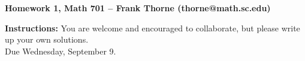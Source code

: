 \documentclass[12pt]{article}
\begin{document}
\setlength{\topmargin}{-2mm}



\newcommand{\sump}{\sideset{}{'}\sum}
\newcommand{\Aa}{{\alpha}}
\newcommand{\cD}{\mathcal{D}}
\newcommand{\C}{\mathbb{C}}
\newcommand{\N}{{\rm{N}}}
\newcommand{\re}{{\rm{max\,red}}}
\newcommand{\nonmax}{{\rm{nonmax}}}
\newcommand{\ma}{{\rm{max}}}
\newcommand{\PGL}{{\rm{PGL}}}
\newcommand{\diag}{{\rm{diag}}}
\newcommand{\sqf}{{\rm{sqf}}}
\newcommand{\Z}{\mathbb{Z}}
\renewcommand{\P}{\mathbb{P}}
\newcommand{\Q}{\mathbb{Q}}
\newcommand{\R}{\mathbb{R}}
\newcommand{\F}{\mathbb{F}}
\newcommand{\FF}{\mathcal{F}}
\newcommand{\OO}{\mathcal{O}}
\newcommand{\A}{\mathbb{A}}
\newcommand{\QQ}{\mathcal{Q}}
\newcommand{\calA}{\mathcal{A}}
\newcommand{\calS}{\mathcal{S}}
\newcommand{\calB}{\mathcal{B}}
\newcommand{\calP}{\mathcal{P}}
\newcommand{\calF}{\mathcal{F}}
\newcommand{\calZ}{\mathcal{Z}}
\newcommand{\calT}{\mathcal{T}}
\newcommand{\calO}{\mathcal{O}}
\newcommand{\Y}{\mathcal{Y}}
\newcommand{\GQ}{G_{\Q}}
\newcommand{\Qbar}{\bar{\Q}}
\newcommand{\ra}{\rightarrow}
\newcommand\Hom{\operatorname{Hom}}
\newcommand\Tr{\operatorname{Tr}}
\newcommand\Aut{\operatorname{Aut}}
\newcommand\Sym{\operatorname{Sym}}
\newcommand\Disc{\operatorname{Disc}}
\newcommand\Vol{\operatorname{Vol}}
\newcommand\Out{\operatorname{Out}}
\newcommand\im{\operatorname{im}}
\renewcommand\div{\operatorname{div}}
\newcommand\irr{\textnormal{irr}}
\newcommand\Stab{\operatorname{Stab}}
\newcommand\Gal{\operatorname{Gal}}
\newcommand\Res{\operatorname{Res}}
\newcommand\SL{\operatorname{SL}}
\newcommand\GL{\operatorname{GL}}
\newcommand\SO{\operatorname{SO}}
\newcommand\ur{\operatorname{ur}}
\newcommand\sr{\operatorname{sr}}
\newcommand\htt{\operatorname{ht}}
\newcommand{\cO}{\mathcal{O}}
\newcommand{\co}{\mathcal{O}}
\newcommand\codim{\operatorname{codim}}


\newcommand{\odr}{\co_{D1^2}}		%
\newcommand{\ods}{\co_{D11}}		%
\newcommand{\odi}{\co_{D2}}		%
\newcommand{\odg}{\co_{D\rm{ns}}}	%
\newcommand{\ocs}{\co_{C\rm{s}}}	%
\newcommand{\ocg}{\co_{C\rm{ns}}}	%
\newcommand{\ots}{\co_{B11}}		%
\newcommand{\oti}{\co_{B2}}		%



\begin{center}{\bf Homework 1, Math 701 -- Frank Thorne (thorne@math.sc.edu)}
\end{center}
\begin{center}
{\bf Instructions:} You are welcome and encouraged to collaborate, but please write up your own solutions. \\

Due Wednesday, September 9.
\end{center}
\end{document}
